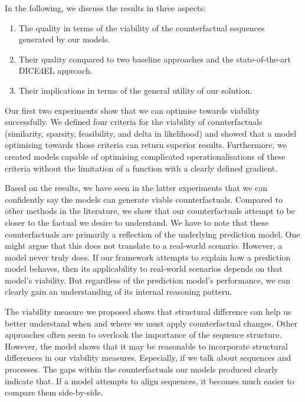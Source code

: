 \documentclass[./../../paper.tex]{subfiles}
\begin{document}
In the following, we discuss the results in three aspects:

\begin{enumerate}
    \item The quality in terms of the viability of the counterfactual sequences generated by our models.
    \item Their quality compared to two baseline approaches and the state-of-the-art DICE4EL approach.
    \item Their implications in terms of the general utility of our solution.
\end{enumerate}

Our first two experiments show that we can optimise towards viability successfully. We defined four criteria for the viability of counterfactuals (similarity, sparsity, feasibility, and delta in likelihood) and showed that a model optimising towards those criteria can return superior results. Furthermore, we created models capable of optimising complicated operationalisations of these criteria without the limitation of a function with a clearly defined gradient. 


Based on the results, we have seen in the latter experiments that we can confidently say the models can generate viable counterfactuals. Compared to other methods in the literature, we show that our counterfactuals attempt to be closer to the factual we desire to understand. We have to note that these counterfactuals are primarily a reflection of the underlying prediction model. One might argue that this does not translate to a real-world scenario. However, a model never truly does. If our framework attempts to explain how a prediction model behaves, then its applicability to real-world scenarios depends on that model's viability. But regardless of the prediction model's performance, we can clearly gain an understanding of its internal reasoning pattern.

The viability measure we proposed shows that structural difference can help us better understand when and where we must apply counterfactual changes. Other approaches often seem to overlook the importance of the sequence structure. However, the  model shows that it may be reasonable to incorporate structural differences in our viability measures. Especially, if we talk about sequences and processes. The gaps within the counterfactuals our models produced clearly indicate that. If a model attempts to align sequences, it becomes much easier to compare them side-by-side.  
\end{document}
